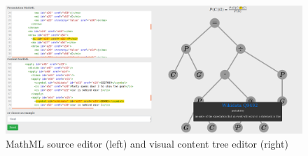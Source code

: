 \begin{figure}[t]
\includegraphics[width=\textwidth]{images/vis.png}
\caption{MathML source editor (left) and visual content tree editor (right)}
\end{figure}
